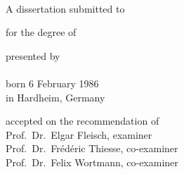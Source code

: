 \begin{titlepage}
    \begin{center}
        \large
        \begingroup
        \endgroup

        \hfill

        \vfill

        \begingroup
            \spacedallcaps{\myTitleOnTitlePageLineOne}\\
            \spacedallcaps{\myTitleOnTitlePageLineTwo}
        \endgroup

        \vfill

        \begingroup
            A dissertation submitted to\\
        \endgroup
        
        \vfill

        \begingroup
            for the degree of\\
        \endgroup

        \vfill

        \begingroup
            presented by\\
            \\
            born 6 February 1986\\
            in Hardheim, Germany
        \endgroup

        \vfill

        \begingroup
            accepted on the recommendation of\\
            Prof.\ Dr.\ Elgar Fleisch, examiner\\
            Prof.\ Dr.\ Fr\'{e}d\'{e}ric Thiesse, co-examiner\\
            Prof.\ Dr.\ Felix Wortmann, co-examiner\\
        \endgroup


        \vfill

        \myTime

        \vfill                      

    \end{center}  
\end{titlepage}   
